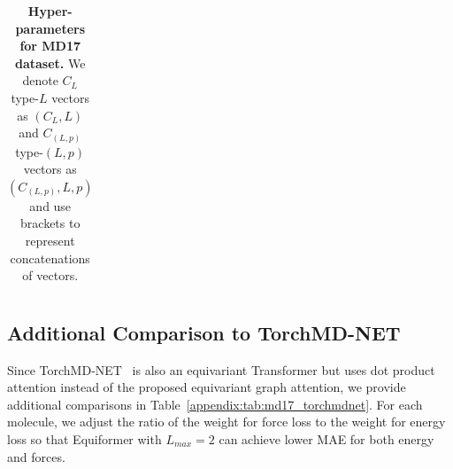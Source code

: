 \begin{table}[]
{\begin{tabular}{ll}
\bottomrule[1.2pt]
\end{tabular}
}
\vspace{-2mm}
\caption{\textbf{Hyper-parameters for MD17 dataset.}
We denote $C_L$ type-$L$ vectors as $(C_L, L)$ and $C_{(L, p)}$ type-$(L, p)$ vectors as $(C_{(L, p)}, L, p)$ and use brackets to represent concatenations of vectors.
}
\label{appendix:tab:md17}
\end{table}


\subsection{Additional Comparison to TorchMD-NET}
\label{appendix:subsec:md17_torchmdnet}
Since TorchMD-NET~\citep{torchmd_net} is also an equivariant Transformer but  uses dot product attention instead of the proposed equivariant graph attention, we provide additional comparisons in Table~\ref{appendix:tab:md17_torchmdnet}.
For each molecule, we adjust the ratio of the weight for force loss to the weight for energy loss so that Equiformer with $L_{max} = 2$ can achieve lower MAE for both energy and forces.



